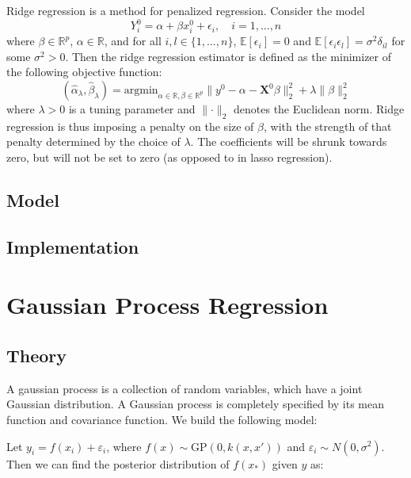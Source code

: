 \documentclass[
]{article}
\begin{document}
Ridge regression is a method for penalized regression. Consider the
model \[Y_i^0 = \alpha + \beta x_i^0 + \epsilon_i, \quad  i = 1,..., n\]
where \(\beta \in \mathbb{R}^p\), \(\alpha \in \mathbb{R}\), and for all
\(i, l \in \{1, ..., n\}\), \(\mathbb{E}[\epsilon_i] = 0\) and
\(\mathbb{E}[\epsilon_i \epsilon_l] = \sigma^2 \delta_{il}\) for some
\(\sigma^2 > 0\). Then the ridge regression estimator is defined as the
minimizer of the following objective function:
\[(\hat{\alpha}_\lambda, \hat{\beta}_\lambda) = \mathrm{argmin}_{\alpha \in \mathbb{R}, \beta \in \mathbb{R}^p} \lVert y^0 - \alpha - \boldsymbol{X}^0 \beta \rVert^2_2 + \lambda \lVert \beta \rVert^2_2\]
where \(\lambda > 0\) is a tuning parameter and
\(\lVert \cdot \rVert_2\) denotes the Euclidean norm. Ridge regression
is thus imposing a penalty on the size of \(\beta\), with the strength
of that penalty determined by the choice of \(\lambda\). The
coefficients will be shrunk towards zero, but will not be set to zero
(as opposed to in lasso regression).

\hypertarget{model-1}{%
\subsection{Model}\label{model-1}}

\hypertarget{implementation-1}{%
\subsection{Implementation}\label{implementation-1}}

\hypertarget{gaussian-process-regression}{%
\section{Gaussian Process
Regression}\label{gaussian-process-regression}}

\hypertarget{theory-2}{%
\subsection{Theory}\label{theory-2}}

A gaussian process is a collection of random variables, which have a
joint Gaussian distribution. A Gaussian process is completely specified
by its mean function and covariance function. We build the following
model:

Let \(y_i = f(x_i) + \varepsilon_i\), where
\(f(x) \sim \text{GP}(0, k(x, x'))\) and
\(\varepsilon_i \sim N(0, \sigma^2)\). Then we can find the posterior
distribution of \(f(x_*)\) given \(y\) as:
\end{document}
